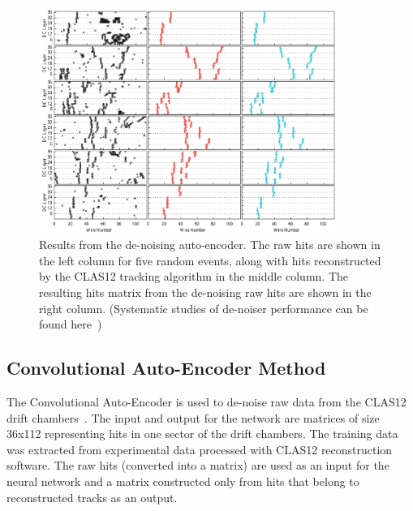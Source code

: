 \documentclass{webofc}
\begin{document}
\begin{figure}[!h]
\begin{center}
 \includegraphics[width=3.8in]{images/cnn_denoise_results.pdf}
\caption {Results from the de-noising auto-encoder. The raw hits are shown
in the left column for five random events, along with hits reconstructed by the 
CLAS12 tracking algorithm in the middle column. The resulting  hits matrix 
from the de-noising raw hits are shown in the right column. (Systematic studies 
of de-noiser performance can be found here~\cite{Thomadakis:2022zcd})}
 \label{network:cnn_results}
 \end{center}
\end{figure}


\subsection{Convolutional Auto-Encoder Method}
\label{aue-method}

The Convolutional Auto-Encoder is used to de-noise raw data from the CLAS12 drift chambers~\cite{Thomadakis:2022zcd}. 
The input and output for the network are matrices of size 36x112 representing hits in one sector of the drift chambers. 
The training data was extracted from experimental data processed with CLAS12 reconstruction software. 
The raw hits (converted into a matrix) are used as an input for the neural network and a matrix constructed 
only from hits that belong to reconstructed tracks as an output. 
\end{document}
